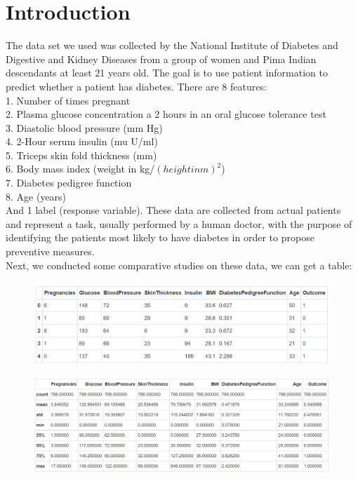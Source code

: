 \documentclass[runningheads]{llncs}
\begin{document}
{\section{Introduction}
The data set we used was collected by the 
National Institute of Diabetes and Digestive and Kidney Diseases 
from a group of women and Pima Indian descendants at least 21 years old. The goal is to use patient information to predict whether a patient has diabetes.
There are 8 features:\\
1. Number of times pregnant\\
2. Plasma glucose concentration a 2 hours in an oral glucose tolerance test\\
3. Diastolic blood pressure (mm Hg)\\
4. 2-Hour serum insulin (mu U/ml)\\
5. Triceps skin fold thickness (mm)\\
6. Body mass index (weight in kg/$(height in m)^2$)\\
7. Diabetes pedigree function\\
8. Age (years)\\
And 1 label (response variable). These data are collected from actual patients and represent a task, 
usually performed by a human doctor, with the purpose of identifying the patients most likely to have
diabetes in order to propose preventive measures. \\
Next, we conducted some comparative studies on these data, we can get a table:\\
\begin{figure}[H]
    \centering
    \includegraphics[scale=0.6]{1.PNG}  
\end{figure}

\begin{figure}[H]
    \centering
    \includegraphics[scale=0.6]{2.PNG}  
\end{figure}


}
\end{document}
